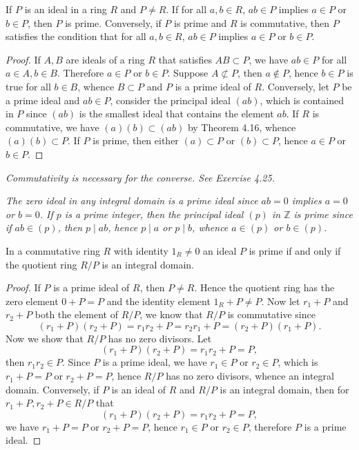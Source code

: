 \begin{theorem}
If $P$ is an ideal in a ring $R$ and $P\ne R$. If for all $a,b\in R$, $ab\in P$ implies $a\in P$ or $b\in P$, then $P$ is prime. Conversely, if $P$ is prime and $R$ is commutative, then $P$ satisfies the condition that for all $a,b\in R$, $ab\in P$ implies $a\in P$ or $b\in P$.
\end{theorem}
\begin{proof}
If $A,B$ are ideals of a ring $R$ that satisfies $AB\subset P$, we have $ab\in P$ for all $a\in A,b\in B$. Therefore $a\in P$ or $b\in P$. Suppose $A\not\subset P$, then $a\notin P$, hence $b\in P$ is true for all $b\in B$, whence $B\subset P$ and $P$ is a prime ideal of $R$. Conversely, let $P$ be a prime ideal and $ab\in P$, consider the principal ideal $(ab)$, which is contained in $P$ since $(ab)$ is the smallest ideal that contains the element $ab$. If $R$ is commutative, we have $(a)(b)\subset(ab)$ by Theorem 4.16, whence $(a)(b)\subset P$. If $P$ is prime, then either $(a)\subset P$ or $(b)\subset P$, hence $a\in P$ or $b\in P$.
\end{proof}
\begin{note}\em
Commutativity is necessary for the converse. See Exercise 4.25.
\end{note}
\begin{example}\em
The zero ideal in any integral domain is a prime ideal since $ab=0$ implies $a=0$ or $b=0$. If $p$ is a prime integer, then the principal ideal $(p)$ in $\mathbb{Z}$ is prime since if $ab\in(p)$, then $p\mid ab$, hence $p\mid a$ or $p\mid b$, whence $a\in(p)$ or $b\in(p)$.
\end{example}
\begin{theorem}
In a commutative ring $R$ with identity $1_R\ne 0$ an ideal $P$ is prime if and only if the quotient ring $R/P$ is an integral domain.
\end{theorem}
\begin{proof}
If $P$ is a prime ideal of $R$, then $P\ne R$. Hence the quotient ring has the zero element $0+P=P$ and the identity element $1_R+P\ne P$. Now let $r_1+P$ and $r_2+P$ both the element of $R/P$, we know that $R/P$ is commutative since 
$$
\left( r_1+P \right) \left( r_2+P \right) =r_1r_2+P=r_2r_1+P=\left( r_2+P \right) \left( r_1+P \right) .
$$
Now we show that $R/P$ has no zero divisors. Let 
$$
\left( r_1+P \right) \left( r_2+P \right) =r_1r_2+P=P,
$$
then $r_1r_2\in P$. Since $P$ is a prime ideal, we have $r_1\in P$ or $r_2\in P$, which is $r_1+P=P$ or $r_2+P=P$, hence $R/P$ has no zero divisors, whence an integral domain. Conversely, if $P$ is an ideal of $R$ and $R/P$ is an integral domain, then for $r_1+P,r_2+P\in R/P$ that 
$$
\left( r_1+P \right) \left( r_2+P \right) =r_1r_2+P=P,
$$
we have $r_1+P=P$ or $r_2+P=P$, hence $r_1\in P$ or $r_2\in P$, therefore $P$ is a prime ideal.
\end{proof}
